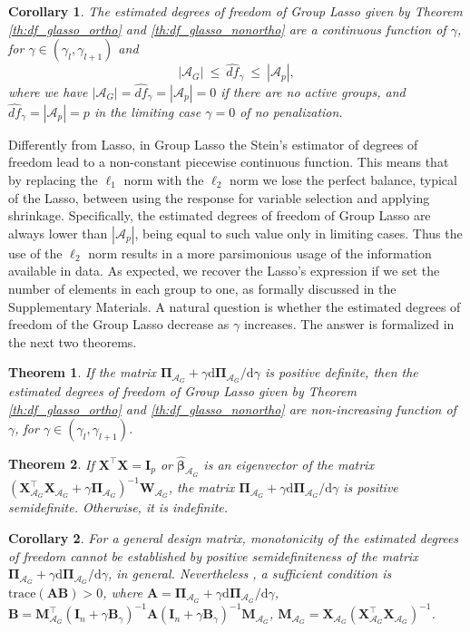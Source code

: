 \documentclass[a4paper, 12pt]{article}
\newcommand{\Aset}{\mathcal{A}}
\newcommand{\betahat}{\widehat{\boldsymbol\beta}}
\newcommand{\trace}{\mathrm{trace}}
\newcommand{\T}{\top}
\def\bPi{\boldsymbol{\Pi}}
\def\bA{\mathbf{A}}
\def\bB{\mathbf{B}}
\def\bI{\mathbf{I}}
\def\bM{\mathbf{M}}
\def\bW{\mathbf{W}}
\def\bX{\mathbf{X}}
\newtheorem{theorem}{Theorem}
\newtheorem{corollary}{Corollary}
\begin{document}
%
\begin{corollary}
\label{coro:bounds_df_glasso}
   The estimated degrees of freedom of Group Lasso given by Theorem \ref{th:df_glasso_ortho} and \ref{th:df_glasso_nonortho} are a continuous function of $\gamma$, for $\gamma  \in (\gamma_l, \gamma_{l+1})$ and
   $$ |\Aset_G| \ \leq \ \widehat{df}_\gamma \ \leq \ |\Aset_p|,$$
   where we have $|\Aset_G| = \widehat{df}_\gamma = |\Aset_p|=0$ if there are no active groups, and $\widehat{df}_\gamma = |\Aset_p|=p$ in the limiting case $\gamma=0$ of no penalization. 
\end{corollary}
%
\noindent Differently from Lasso, in Group Lasso the Stein's estimator of degrees of freedom lead to a non-constant piecewise continuous function. This means that by replacing the $\ell_1$ norm with the $\ell_2$ norm we lose the perfect balance, typical of the Lasso, between using the response for variable selection and applying shrinkage. Specifically, the estimated degrees of freedom of Group Lasso are always lower than $|\Aset_p|$, being equal to such value only in limiting cases. Thus the use of the $\ell_2$ norm results in a more parsimonious usage of the information available in data. 
As expected, we recover the Lasso's expression if we set the number of elements in each group to one, as formally discussed in %
the Supplementary Materials.
%
A natural question is whether the estimated degrees of freedom of the Group Lasso decrease as $\gamma$ increases. The answer is formalized in the next two theorems.
%
\begin{theorem}
\label{th:monotonicity_df_glasso}
If the matrix $\bPi_{\Aset_G} + \gamma \mathrm{d} \bPi_{\Aset_G} / \mathrm{d}\gamma $ is positive definite, then the estimated degrees of freedom of Group Lasso given by Theorem \ref{th:df_glasso_ortho} and \ref{th:df_glasso_nonortho} are non-increasing function of $\gamma$, for $\gamma \in (\gamma_l, \gamma_{l+1})$.
\end{theorem}
%
\begin{theorem}
\label{th:matrix_Pi_indefinite}
    If $\bX^{\T} \bX = \bI_p$ or $\betahat_{\Aset_G}$ is an eigenvector of the matrix $(\bX_{\Aset_G}^{\T} \bX_{\Aset_G} + \gamma \bPi_{\Aset_G})^{-1} \bW_{\Aset_G}$, the matrix $\bPi_{\Aset_G} + \gamma \mathrm{d} \bPi_{\Aset_G} / \mathrm{d}\gamma$ is positive semidefinite. Otherwise, it is indefinite.
\end{theorem}
%
\begin{corollary}
\label{coro:sufficient_nonortho}
    For a general design matrix, monotonicity of the estimated degrees of freedom cannot be established by positive semidefiniteness of the matrix $\bPi_{\Aset_G} + \gamma \mathrm{d} \bPi_{\Aset_G} / \mathrm{d}\gamma$, in general. Nevertheless%
    , a sufficient condition is $\trace(\bA\bB) > 0$, where $\bA = \bPi_{\Aset_G} + \gamma \mathrm{d} \bPi_{\Aset_G} / \mathrm{d}\gamma$,  $\bB = \bM_{\Aset_G}^{\T}\left( \bI_n+\gamma  \bB_\gamma\right)^{-1}  \bA\left( \bI_n+\gamma  \bB_\gamma\right)^{-1}\bM_{\Aset_G}$, $\bM_{\Aset_G}=\bX_{\Aset_G}(\bX_{\Aset_G}^{\T}\bX_{\Aset_G})^{-1}$.
\end{corollary}
\end{document}
